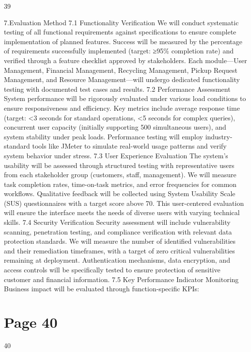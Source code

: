 \documentclass{article}
\begin{document}
 
 39  
 
7.Evaluation Method 
7.1 Functionality Verification 
We will conduct systematic testing of all functional requirements against specifications to 
ensure complete implementation of planned features. Success will be measured by the 
percentage of requirements successfully implemented (target: ≥95\% completion rate) and 
verified through a feature checklist approved by stakeholders. Each module—User 
Management, Financial Management, Recycling Management, Pickup Request Management, 
and Resource Management—will undergo dedicated functionality testing with documented test 
cases and results. 
7.2 Performance Assessment 
System performance will be rigorously evaluated under various load conditions to ensure 
responsiveness and efficiency. Key metrics include average response time (target: <3 seconds 
for standard operations, <5 seconds for complex queries), concurrent user capacity (initially 
supporting 500 simultaneous users), and system stability under peak loads. Performance 
testing will employ industry-standard tools like JMeter to simulate real-world usage patterns 
and verify system behavior under stress. 
7.3 User Experience Evaluation 
The system's usability will be assessed through structured testing with representative users 
from each stakeholder group (customers, staff, management). We will measure task 
completion rates, time-on-task metrics, and error frequencies for common workflows. 
Qualitative feedback will be collected using System Usability Scale (SUS) questionnaires with a 
target score above 70. This user-centered evaluation will ensure the interface meets the needs 
of diverse users with varying technical skills. 
7.4 Security Verification 
Security assessment will include vulnerability scanning, penetration testing, and compliance 
verification with relevant data protection standards. We will measure the number of identified 
vulnerabilities and their remediation timeframes, with a target of zero critical vulnerabilities 
remaining at deployment. Authentication mechanisms, data encryption, and access controls 
will be specifically tested to ensure protection of sensitive customer and financial information. 
7.5 Key Performance Indicator Monitoring 
Business impact will be evaluated through function-specific KPIs: 

\section*{Page 40}
   
 
 40  
 
\end{document}
